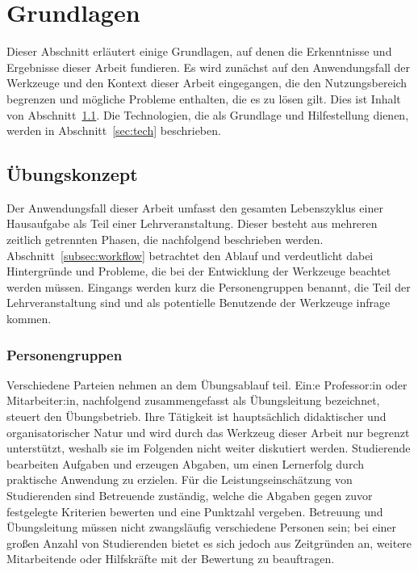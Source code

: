 \chapter{Grundlagen}\label{ch:basics}

Dieser Abschnitt erläutert einige Grundlagen, auf denen die Erkenntnisse und Ergebnisse dieser Arbeit fundieren.
Es wird zunächst auf den Anwendungsfall der Werkzeuge und den Kontext dieser Arbeit eingegangen, die den Nutzungsbereich begrenzen und mögliche Probleme enthalten, die es zu lösen gilt.
Dies ist Inhalt von Abschnitt~\ref{sec:programming-assignments}.
Die Technologien, die als Grundlage und Hilfestellung dienen, werden in Abschnitt~\ref{sec:tech} beschrieben.

\section{Übungskonzept}\label{sec:programming-assignments}

Der Anwendungsfall dieser Arbeit umfasst den gesamten Lebenszyklus einer Hausaufgabe als Teil einer Lehrveranstaltung.
Dieser besteht aus mehreren zeitlich getrennten Phasen, die nachfolgend beschrieben werden.
Abschnitt~\ref{subsec:workflow} betrachtet den Ablauf und verdeutlicht dabei Hintergründe und Probleme, die bei der Entwicklung der Werkzeuge beachtet werden müssen.
Eingangs werden kurz die Personengruppen benannt, die Teil der Lehrveranstaltung sind und als potentielle Benutzende der Werkzeuge infrage kommen.

\subsection{Personengruppen}\label{subsec:people}

Verschiedene Parteien nehmen an dem Übungsablauf teil.
Ein:e Professor:in oder Mitarbeiter:in, nachfolgend zusammengefasst als Übungsleitung bezeichnet, steuert den Übungsbetrieb.
Ihre Tätigkeit ist hauptsächlich didaktischer und organisatorischer Natur und wird durch das Werkzeug dieser Arbeit nur begrenzt unterstützt, weshalb sie im Folgenden nicht weiter diskutiert werden.
Studierende bearbeiten Aufgaben und erzeugen Abgaben, um einen Lernerfolg durch praktische Anwendung zu erzielen.
Für die Leistungseinschätzung von Studierenden sind Betreuende zuständig, welche die Abgaben gegen zuvor festgelegte Kriterien bewerten und eine Punktzahl vergeben.
Betreuung und Übungsleitung müssen nicht zwangsläufig verschiedene Personen sein;
bei einer großen Anzahl von Studierenden bietet es sich jedoch aus Zeitgründen an, weitere Mitarbeitende oder Hilfskräfte mit der Bewertung zu beauftragen.

